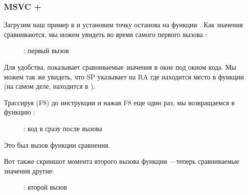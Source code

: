 ﻿\clearpage
\subsubsection{MSVC + \olly}
\myindex{\olly}

Загрузим наш пример в \olly и установим точку останова на функции \comp{}.
Как значения сравниваются, мы можем увидеть во время самого первого вызова \comp{}:

\begin{figure}[H]
\centering
{}
\caption{\olly: первый вызов \comp}
\label{fig:qsort_olly1}
\end{figure}

Для удобства, \olly показывает сравниваемые значения в окне под окном кода.
Мы можем так же увидеть, что \ac{SP} указывает на \ac{RA} где находится место в функции \qsort (на самом деле, находится в ).

\clearpage
Трассируя (F8) до инструкции  и нажав F8 еще один раз, мы возвращаемся в функцию \qsort:

\begin{figure}[H]
\centering
{}
\caption{\olly: код в \qsort сразу после вызова \comp}
\label{fig:qsort_olly2}
\end{figure}

Это был вызов функции сравнения.

\clearpage
Вот также скриншот момента второго вызова функции \comp{}---теперь сравниваемые значения другие:

\begin{figure}[H]
\centering
{}
\caption{\olly: второй вызов \comp}
\label{fig:qsort_olly3}
\end{figure}
